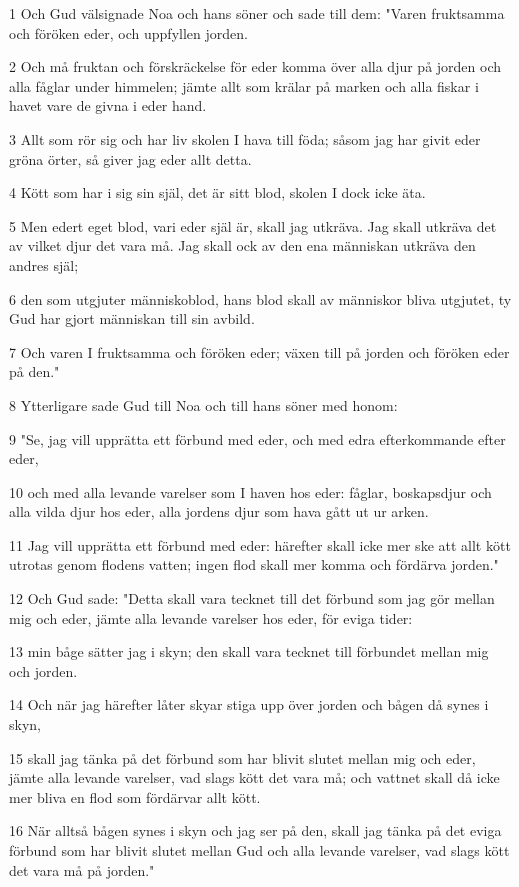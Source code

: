 \par 1 Och Gud välsignade Noa och hans söner och sade till dem: "Varen fruktsamma och föröken eder, och uppfyllen jorden.
\par 2 Och må fruktan och förskräckelse för eder komma över alla djur på jorden och alla fåglar under himmelen; jämte allt som krälar på marken och alla fiskar i havet vare de givna i eder hand.
\par 3 Allt som rör sig och har liv skolen I hava till föda; såsom jag har givit eder gröna örter, så giver jag eder allt detta.
\par 4 Kött som har i sig sin själ, det är sitt blod, skolen I dock icke äta.
\par 5 Men edert eget blod, vari eder själ är, skall jag utkräva. Jag skall utkräva det av vilket djur det vara må. Jag skall ock av den ena människan utkräva den andres själ;
\par 6 den som utgjuter människoblod, hans blod skall av människor bliva utgjutet, ty Gud har gjort människan till sin avbild.
\par 7 Och varen I fruktsamma och föröken eder; växen till på jorden och föröken eder på den."
\par 8 Ytterligare sade Gud till Noa och till hans söner med honom:
\par 9 "Se, jag vill upprätta ett förbund med eder, och med edra efterkommande efter eder,
\par 10 och med alla levande varelser som I haven hos eder: fåglar, boskapsdjur och alla vilda djur hos eder, alla jordens djur som hava gått ut ur arken.
\par 11 Jag vill upprätta ett förbund med eder: härefter skall icke mer ske att allt kött utrotas genom flodens vatten; ingen flod skall mer komma och fördärva jorden."
\par 12 Och Gud sade: "Detta skall vara tecknet till det förbund som jag gör mellan mig och eder, jämte alla levande varelser hos eder, för eviga tider:
\par 13 min båge sätter jag i skyn; den skall vara tecknet till förbundet mellan mig och jorden.
\par 14 Och när jag härefter låter skyar stiga upp över jorden och bågen då synes i skyn,
\par 15 skall jag tänka på det förbund som har blivit slutet mellan mig och eder, jämte alla levande varelser, vad slags kött det vara må; och vattnet skall då icke mer bliva en flod som fördärvar allt kött.
\par 16 När alltså bågen synes i skyn och jag ser på den, skall jag tänka på det eviga förbund som har blivit slutet mellan Gud och alla levande varelser, vad slags kött det vara må på jorden."
